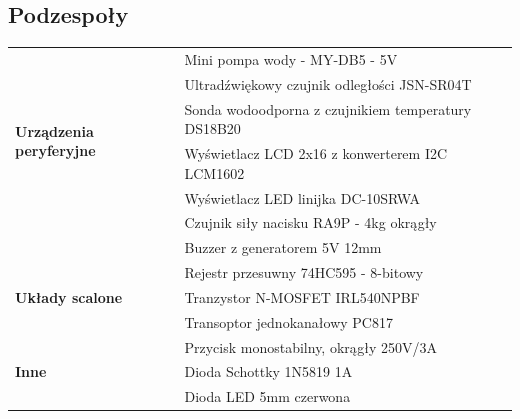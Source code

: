 \documentclass[11pt]{article}
\begin{document}
\subsection{Podzespoły}
\FloatBarrier
\begin{table}[!htbp]
\begin{tabular}{|l|l|}
\hline
\multirow{6}{*}{\textbf{Urządzenia peryferyjne}} & Mini pompa wody - MY-DB5 - 5V                                           \\ \cline{2-2} 
                                                 & Ultradźwiękowy czujnik odległości JSN-SR04T \\ \cline{2-2} 
                                                 & Sonda wodoodporna z czujnikiem temperatury DS18B20                      \\ \cline{2-2} 
                                                 & Wyświetlacz LCD 2x16 z konwerterem I2C LCM1602         \\ \cline{2-2} 
                                                 & Wyświetlacz LED linijka DC-10SRWA            \\ \cline{2-2} 
                                                 & Czujnik siły nacisku RA9P - 4kg okrągły                                 \\ \cline{2-2}
                                                 & Buzzer z generatorem 5V 12mm                                 \\ \hline
\multirow{3}{*}{\textbf{Układy scalone}}         & Rejestr przesuwny 74HC595 - 8-bitowy                                    \\ \cline{2-2} 
                                                 & Tranzystor N-MOSFET IRL540NPBF                                    \\ \cline{2-2} 
                                                 & Transoptor jednokanałowy PC817                                   \\ \hline
\multirow{3}{*}{\textbf{Inne}}                   & Przycisk monostabilny, okrągły 250V/3A                            \\ \cline{2-2} 
                                                 & Dioda Schottky 1N5819 1A                                                \\ \cline{2-2} 
                                                 & Dioda LED 5mm czerwona                                                  \\ \hline
\end{tabular}
\end{table}
\end{document}
